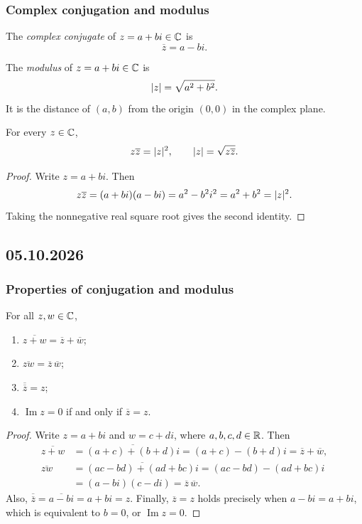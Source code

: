 \documentclass[11pt,a4paper]{amsart}
\begin{document}
\subsubsection{Complex conjugation and modulus}

\begin{definition}
  The \emph{complex conjugate} of \(z=a+bi\in\mathbb{C}\) is
  \[
    \overline{z}=a-bi.
  \]
\end{definition}

\begin{definition}
  The \emph{modulus} of \(z=a+bi\in\mathbb{C}\) is
  \[
    \lvert z\rvert=\sqrt{a^2+b^2}.
  \]
  It is the distance of \((a,b)\) from the origin \((0,0)\) in the
  complex plane.
\end{definition}

\begin{proposition}
  For every \(z\in\mathbb{C}\),
  \[
    z\overline{z}=\lvert z\rvert^2,\qquad
    \lvert z\rvert=\sqrt{z\overline{z}}.
  \]
\end{proposition}

\begin{proof}
  Write \(z=a+bi\). Then
  \[
    z\overline{z}=(a+bi)(a-bi)=a^2-b^2i^2=a^2+b^2=\lvert z\rvert^2.
  \]
  Taking the nonnegative real square root gives the second identity.
\end{proof}

\subsection{05.10.2026}

\subsubsection{Properties of conjugation and modulus}

\begin{proposition}
  For all \(z,w\in\mathbb{C}\),
  \begin{enumerate}[label=(\alph*)]
    \item \(\overline{z+w}=\overline z+\overline w\);
    \item \(\overline{zw}=\overline z\,\overline w\);
    \item \(\overline{\overline z}=z\);
    \item \(\operatorname{Im}z=0\) if and only if \(\overline z=z\).
  \end{enumerate}
\end{proposition}

\begin{proof}
  Write \(z=a+bi\) and \(w=c+di\), where \(a,b,c,d\in\mathbb{R}\).
  Then
  \begin{align*}
    \overline{z+w}
    &=\overline{(a+c)+(b+d)i}
    =(a+c)-(b+d)i=\overline z+\overline w,\\
    \overline{zw}
    &=\overline{(ac-bd)+(ad+bc)i}
    =(ac-bd)-(ad+bc)i\\
    &=(a-bi)(c-di)=\overline z\,\overline w.
  \end{align*}
  Also, \(\overline{\overline z}=\overline{a-bi}=a+bi=z\).
  Finally, \(\overline z=z\) holds precisely when
  \(a-bi=a+bi\), which is equivalent to \(b=0\), or
  \(\operatorname{Im}z=0\).
\end{proof}
\end{document}
